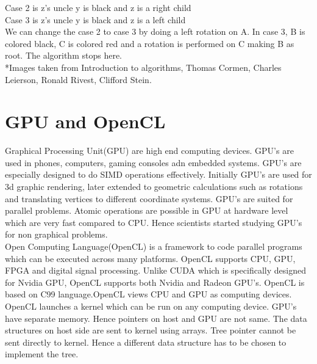 \documentclass[BTech]{iitmdiss}
\begin{document}
Case 2 is z's uncle y is black and z is a right child\\
Case 3 is z's uncle y is black and z is a left child\\
We can change the case 2 to case 3 by doing a left rotation on A. In case 3, B is colored black, C is colored red and a rotation is performed on C making B as root. The algorithm stops here.\\
*Images taken from Introduction to algorithms, Thomas Cormen, Charles Leierson, Ronald Rivest,  Clifford Stein.
\section{GPU and OpenCL}
Graphical Processing Unit(GPU) are high end computing devices. GPU's are used in phones, computers, gaming consoles adn embedded systems. GPU's are especially designed to do SIMD operations effectively. Initially GPU's are used for 3d graphic rendering, later extended to geometric calculations such as rotations and translating vertices to different coordinate systems. GPU's are suited for parallel problems. Atomic operations are possible in GPU at hardware level which are very fast compared to CPU. Hence scientists started studying GPU's for non graphical problems.\\
Open Computing Language(OpenCL) is a framework to code parallel programs which can be executed across many platforms. OpenCL supports CPU, GPU, FPGA and digital signal processing. Unlike CUDA which is specifically designed for Nvidia GPU, OpenCL supports both Nvidia and Radeon GPU's. OpenCL is based on C99 language.OpenCL views CPU and GPU as computing devices. OpenCL launches a kernel which can be run on any computing device. GPU's have separate memory. Hence pointers on host and GPU are not same. The data structures on host side are sent to kernel using arrays. Tree pointer cannot be sent directly to kernel. Hence a different data structure has to be chosen to implement the tree.
\end{document}
